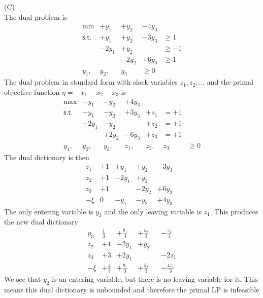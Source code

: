 \documentclass[11pt]{article}
\begin{document}
\medskip

\noindent (C)
\\
The dual problem is
\[\begin{array}{rllllll}
\min & +y_1 & +y_2 & -4y_3 \\
\mathsf{s.t.}
& +y_1 & +y_2 & -3y_3 & \geq 1 \\
& -2y_1 & +y_2 & & \geq -1 \\
& & -2y_2 & +6y_3 & \geq 1 \\
y_1, & y_2, & y_3 & \geq 0
\end{array}\]
The dual problem in standard form with slack variables $z_1, z_2, \ldots$ and the primal objective function $\eta = -x_1 - x_2 - x_3$ is
\[\begin{array}{rllllll}
\max & -y_1 & -y_2 & +4y_3 \\
\mathsf{s.t.}
& -y_1 & -y_2 & +3y_3 & +z_1 & = +1 \\
& +2y_1 & -y_2 & & +z_2 & = +1 \\
& & +2y_2 & -6y_3 & +z_3 & = +1 \\
y_1, & y_2, & y_3, & z_1, & z_2, & z_3 & \geq 0
\end{array}\]
The dual dictionary is then
\[\begin{array}{r|cccccccc}
z_1 & +1 & +y_1 & +y_2 & -3y_3 \\
z_2 & +1 & -2y_1 & +y_2 & & \\
z_3 & +1 & & -2y_2 & +6y_3 \\
\hline
-\xi & 0 & -y_1 & -y_2 & +4y_3
\end{array}\]
The only entering variable is $y_3$ and the only leaving variable is $z_1$.  This produces the new dual dictionary
\[\begin{array}{r|cccccccc}
y_3 & \frac{1}{3} & +\frac{y_1}{3} & +\frac{y_2}{3} & & -\frac{z_1}{3}\\
z_2 & +1 & -2y_1 & +y_2 & & \\
z_3 & +3 & +2y_1 & & & -2z_1 \\
\hline
-\xi & +\frac{4}{3} & +\frac{y_1}{3} & +\frac{y_2}{3} & & -\frac{4z_1}{3}
\end{array}\]
We see that $y_2$ is an entering variable, but there is no leaving variable for it.  This means this dual dictionary is unbounded and therefore the primal LP is infeasible
\bigskip
\end{document}
